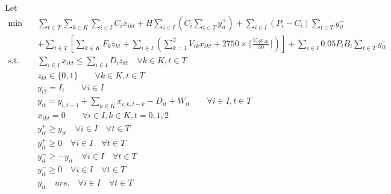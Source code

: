 \documentclass[12pt,a4paper]{article}
\begin{document}
Let\\

\begin{equation*}
\begin{aligned}
\mbox{min} \quad &\sum_{t \in T}\sum_{k \in K}\sum_{i \in I}C_ix_{ikt} + H\sum_{i \in I}(C_i\sum_{t \in T}y_{it}^+) + \sum_{i \in I}(P_i-C_i)\sum_{t \in T}y_{it}^-\\ &+ \sum_{t\in T}^{}[\sum_{k\in K}^{}F_kz_{kt}+ \sum_{i \in I}^{}(\sum_{k=1}^{2} V_{ik}x_{ikt}+2750\times\lceil \frac{V_{i3}x_{i3t}}{30} \rceil)] + \sum_{i \in I}0.05P_iB_i\sum_{t \in T}y_{it}^-\\
\mbox{s.t.} \quad
&\sum_{i \in I}^{} x_{ikt} \leq \sum_{i \in I}^{}D_{i}z_{kt} \quad \forall k \in K, t \in T\\
&z_{kt} \in \{0, 1\} \qquad \forall k \in K, t \in T\\
&y_{i2} = I_{i}\qquad\forall i \in I\\
&y_{it} = y_{i,t-1}+ \sum_{k \in K}^{} x_{i,k,t-k} - D_{it} + W_{it}\qquad \forall i \in I, t \in T\\
&x_{ikt} = 0\qquad\forall i \in I, k \in K, t=0,1,2\\
&y_{it}^+ \geq y_{it} \quad \forall i \in I \quad \forall t \in T\\
&y_{it}^+ \geq 0  \quad \forall i \in I \quad \forall t \in T\\
&y_{it}^- \geq -y_{it}  \quad \forall i \in I \quad \forall t \in T\\
&y_{it}^- \geq 0  \quad \forall i \in I \quad \forall t \in T\\
&y_{it} \quad urs. \quad \forall i \in I \quad \forall t \in T\\
\end{aligned}
\end{equation*}
\end{document}
